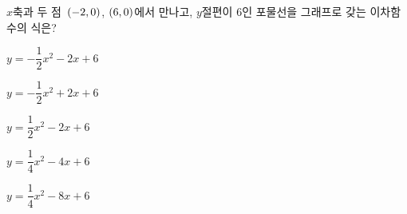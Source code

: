 $x$축과 두 점~$(-2{,}\mkern3mu 0)$, $(6{,}\mkern3mu 0)$에서 만나고, $y$절편이 $6$인 포물선을 그래프로 갖는 이차함수의 식은?
\begin{choicesii}{\rule[-3ex]{0pt}{8ex}$y=-\dfrac{1}{2}x^2-2x+6$}{\rule[-3ex]{0pt}{8ex}$y=-\dfrac{1}{2}x^2+2x+6$}{\rule[-3ex]{0pt}{8ex}$y=\dfrac{1}{2}x^2-2x+6$}{\rule[-3ex]{0pt}{8ex}$y=\dfrac{1}{4}x^2-4x+6$}{\rule[-3ex]{0pt}{8ex}$y=\dfrac{1}{4}x^2-8x+6$}\end{choicesii}
